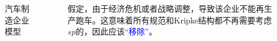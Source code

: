 \documentclass[9pt, CJK]{beamer}
\begin{document}
\begin{frame}
{\begin{example}[汽车制造企业模型]
\begin{columns}
\begin{figure}
		\caption{{\tiny 汽车制造企业模型}}\label{BVM}
	\end{figure}
			假定，由于经济危机或者战略调整，导致该企业不能再生产跑车。这意味着所有规范和Kripke结构都不再需要考虑$sp$的，因此应该\textcolor{blue}{“移除”}。
		\end{columns} 
	\end{example}}
\end{frame}
	
\end{document}
